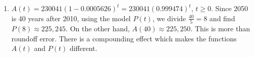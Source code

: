 \begin{enumerate}
\begin{enumerate}
\item  $A(t) = 230041(1 - 0.0005626)^{t} =  230041 (0.999474)^{t}$, $t \geq 0$.  Since 2050 is 40 years after 2010, using the model $P(t)$, we divide $\frac{40}{5} = 8$ and find $P(8) \approx 225,245$. On the other hand, $A(40) \approx 225,250$.  This is more than roundoff error.  There is a compounding effect which makes the functions $A(t)$ and $P(t)$ different. 

\end{enumerate}


\setcounter{HW}{\value{enumi}}
\end{enumerate}


